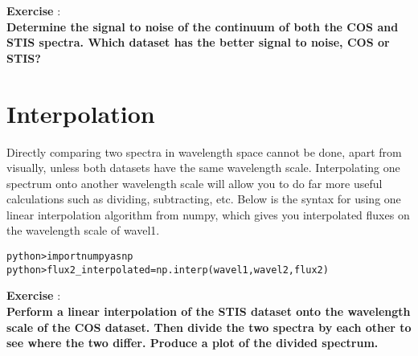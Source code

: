 {\bf \color{blue} Exercise  }:  \\
{\bf Determine the signal to noise of the continuum of both the COS and STIS spectra. Which dataset has the better signal to noise, COS or STIS?} 

\section{Interpolation}
Directly comparing two spectra in wavelength space cannot be done, apart from visually, unless both datasets have the same wavelength scale.  Interpolating one spectrum onto another wavelength scale will allow you to do far more useful calculations such as dividing, subtracting, etc. Below is the syntax for using one linear interpolation algorithm from numpy, which gives you interpolated fluxes on the wavelength scale of wavel1.
\begin{alltt}
python> import numpy as np
python> flux2_interpolated = np.interp(wavel1, wavel2, flux2)
\end{alltt}

{\bf \color{blue} Exercise  }:  \\
{\bf Perform a linear interpolation of the STIS dataset onto the wavelength scale of the COS dataset.  Then divide the two spectra by each other to see where the two differ. Produce a plot of the divided spectrum.} 



